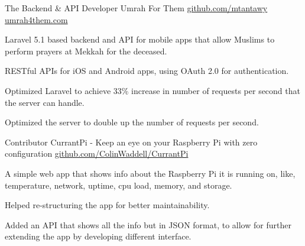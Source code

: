 


\begin{cventries}

  \cventry
    {The Backend \& API Developer} %
    {Umrah For Them} %
    {\href{https://github.com/mtantawy/UmrahForThemBackend} {github.com/mtantawy}} %
    {\href{http://umrah4them.com} {umrah4them.com}} %
    {
      \begin{cvitems} %
        \item {Laravel 5.1 based backend and API for mobile apps that allow Muslims to perform prayers at Mekkah for the deceased.}
        \item {RESTful APIs for iOS and Android apps, using OAuth 2.0 for authentication.}
        \item {Optimized Laravel to achieve 33\% increase in number of requests per second that the server can handle.}
        \item {Optimized the server to double up the number of requests per second.}
      \end{cvitems}
    }


  \cventry
    {Contributor} %
    {CurrantPi - Keep an eye on your Raspberry Pi with zero configuration} %
    {\href{http://github.com/ColinWaddell/CurrantPi} {github.com/ColinWaddell/CurrantPi}} %
    {} %
    {
      \begin{cvitems} %
        \item {A simple web app that shows info about the Raspberry Pi it is running on, like, temperature, network, uptime, cpu load, memory, and storage.}
        \item {Helped re-structuring the app for better maintainability.}
        \item {Added an API that shows all the info but in JSON format, to allow for further extending the app by developing different interface.}
      \end{cvitems}
    }



\end{cventries}
